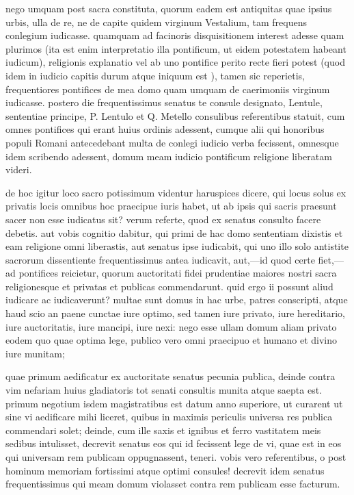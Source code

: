  nego umquam post sacra constituta, quorum eadem est antiquitas quae ipsius urbis, ulla de re, ne de capite quidem virginum Vestalium, tam frequens conlegium iudicasse. quamquam ad facinoris disquisitionem interest adesse quam plurimos (ita est enim interpretatio illa pontificum, ut eidem potestatem habeant iudicum), religionis explanatio vel ab uno pontifice perito recte fieri potest (quod idem in iudicio capitis durum atque iniquum est ), tamen sic reperietis, frequentiores pontifices de mea domo quam umquam de caerimoniis virginum iudicasse. postero die frequentissimus senatus te consule designato, Lentule, sententiae principe, P. Lentulo et Q. Metello consulibus referentibus statuit, cum omnes pontifices qui erant huius ordinis adessent, cumque alii qui honoribus populi Romani antecedebant multa de conlegi iudicio verba fecissent, omnesque idem scribendo adessent, domum meam iudicio pontificum religione liberatam videri.

 de hoc igitur loco sacro potissimum videntur haruspices dicere, qui locus solus ex privatis locis omnibus hoc praecipue iuris habet, ut ab ipsis qui sacris praesunt sacer non esse iudicatus sit? verum referte, quod ex senatus consulto facere debetis. aut vobis cognitio dabitur, qui primi de hac domo sententiam dixistis et eam religione omni liberastis, aut senatus ipse iudicabit, qui uno illo solo antistite sacrorum dissentiente frequentissimus antea iudicavit, aut,—id quod certe fiet,—ad pontifices reicietur, quorum auctoritati fidei prudentiae maiores nostri sacra religionesque et privatas et publicas commendarunt. quid ergo ii possunt aliud iudicare ac iudicaverunt? multae sunt domus in hac urbe, patres conscripti, atque haud scio an paene cunctae iure optimo, sed tamen iure privato, iure hereditario, iure auctoritatis, iure mancipi, iure nexi: nego esse ullam domum aliam privato eodem quo quae optima lege, publico vero omni praecipuo et humano et divino iure munitam;

 quae primum aedificatur ex auctoritate senatus pecunia publica, deinde contra vim nefariam huius gladiatoris tot senati consultis munita atque saepta est. primum negotium isdem magistratibus est datum anno superiore, ut curarent ut sine vi aedificare mihi liceret, quibus in maximis periculis universa res publica commendari solet; deinde, cum ille saxis et ignibus et ferro vastitatem meis sedibus intulisset, decrevit senatus eos qui id fecissent lege de vi, quae est in eos qui universam rem publicam oppugnassent, teneri. vobis vero referentibus, o post hominum memoriam fortissimi atque optimi consules! decrevit idem senatus frequentissimus qui meam domum violasset contra rem publicam esse facturum.

